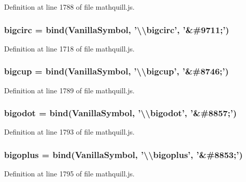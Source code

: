 Definition at line 1788 of file mathquill.\-js.

\subsubsection[{bigcirc}]{ bigcirc = {\bf bind}({\bf Vanilla\-Symbol}, '\textbackslash{}\textbackslash{}bigcirc', '\&\#9711;')}\label{mathquill_8js_a9285cf059b68c6d503582a0e94ecdd36}


Definition at line 1718 of file mathquill.\-js.

\subsubsection[{bigcup}]{ bigcup = {\bf bind}({\bf Vanilla\-Symbol}, '\textbackslash{}\textbackslash{}bigcup', '\&\#8746;')}\label{mathquill_8js_a68974489e96d0c219e74e32c7c68bd04}


Definition at line 1789 of file mathquill.\-js.

\subsubsection[{bigodot}]{ bigodot = {\bf bind}({\bf Vanilla\-Symbol}, '\textbackslash{}\textbackslash{}bigodot', '\&\#8857;')}\label{mathquill_8js_a33e1150a36f7c06c084cefdd4dfe8741}


Definition at line 1793 of file mathquill.\-js.

\subsubsection[{bigoplus}]{ bigoplus = {\bf bind}({\bf Vanilla\-Symbol}, '\textbackslash{}\textbackslash{}bigoplus', '\&\#8853;')}\label{mathquill_8js_aea38f720e3fdeab1e2246dc61a0bf821}


Definition at line 1795 of file mathquill.\-js.

